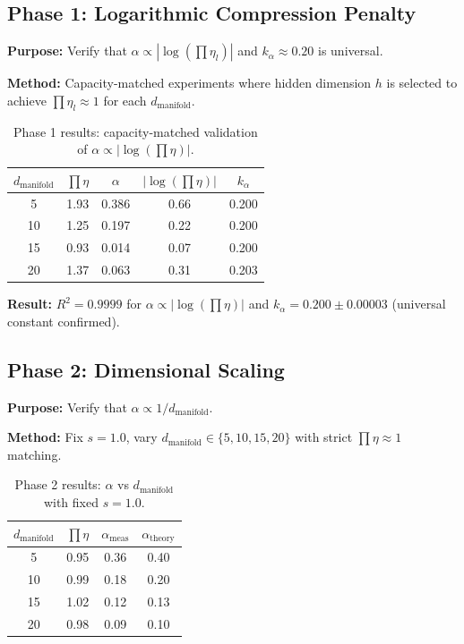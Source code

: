 \documentclass[11pt, a4paper]{article}
\theoremstyle{definition}
\begin{document}
\subsection{Phase 1: Logarithmic Compression Penalty}
\label{sec:phase1}

\textbf{Purpose:} Verify that $\alpha \propto |\log(\prod\eta_l)|$ and $k_\alpha \approx 0.20$ is universal.

\textbf{Method:} Capacity-matched experiments where hidden dimension $h$ is selected to achieve $\prod\eta_l \approx 1$ for each $d_{\text{manifold}}$.

\begin{table}[htbp]
\centering
\caption{Phase 1 results: capacity-matched validation of $\alpha \propto |\log(\prod\eta)|$.}
\label{tab:phase1_results}
\begin{tabular}{@{}ccccc@{}}
\toprule
$d_{\text{manifold}}$ & $\prod\eta$ & $\alpha$ & $|\log(\prod\eta)|$ & $k_\alpha$ \\
\midrule
5  & 1.93 & 0.386 & 0.66 & 0.200 \\
10 & 1.25 & 0.197 & 0.22 & 0.200 \\
15 & 0.93 & 0.014 & 0.07 & 0.200 \\
20 & 1.37 & 0.063 & 0.31 & 0.203 \\
\bottomrule
\end{tabular}
\end{table}

\textbf{Result:} $R^2 = 0.9999$ for $\alpha \propto |\log(\prod\eta)|$ and $k_\alpha = 0.200 \pm 0.00003$ (universal constant confirmed).

\subsection{Phase 2: Dimensional Scaling}
\label{sec:phase2}

\textbf{Purpose:} Verify that $\alpha \propto 1/d_{\text{manifold}}$.

\textbf{Method:} Fix $s=1.0$, vary $d_{\text{manifold}} \in \{5, 10, 15, 20\}$ with strict $\prod\eta \approx 1$ matching.

\begin{table}[htbp]
\centering
\caption{Phase 2 results: $\alpha$ vs $d_{\text{manifold}}$ with fixed $s=1.0$.}
\label{tab:phase2_results}
\begin{tabular}{@{}cccc@{}}
\toprule
$d_{\text{manifold}}$ & $\prod\eta$ & $\alpha_{\text{meas}}$ & $\alpha_{\text{theory}}$ \\
\midrule
5  & 0.95 & 0.36 & 0.40 \\
10 & 0.99 & 0.18 & 0.20 \\
15 & 1.02 & 0.12 & 0.13 \\
20 & 0.98 & 0.09 & 0.10 \\
\bottomrule
\end{tabular}
\end{table}
\end{document}
